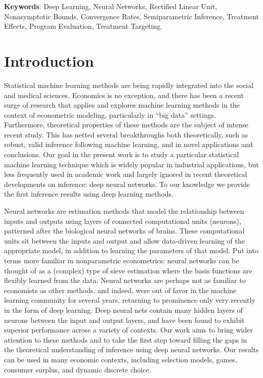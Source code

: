 \documentclass[11pt]{article}
\numberwithin{equation}{section}
\theoremstyle{definition}
\begin{document}
\textbf{Keywords}: Deep Learning, Neural Networks, Rectified Linear Unit, Nonasymptotic Bounds, Convergence Rates, Semiparametric Inference, Treatment Effects, Program Evaluation, Treatment Targeting.

\setcounter{page}{0}
\thispagestyle{empty}




\doublespacing





\section{Introduction}
	\label{sec:intro}
	



Statistical machine learning methods are being rapidly integrated into the social and medical sciences. Economics is no exception, and there has been a recent surge of research that applies and explores machine learning methods in the context of econometric modeling, particularly in ``big data'' settings. Furthermore, theoretical properties of these methods are the subject of intense recent study. This has netted several breakthroughs both theoretically, such as robust, valid inference following machine learning, and in novel applications and conclusions. Our goal in the present work is to study a particular statistical machine learning technique which is widely popular in industrial applications, but less frequently used in academic work and largely ignored in recent theoretical developments on inference: deep neural networks. To our knowledge we provide the first inference results using deep learning methods.

Neural networks are estimation methods that model the relationship between inputs and outputs using layers of connected computational units (neurons), patterned after the biological neural networks of brains. These computational units sit between the inputs and output and allow data-driven learning of the appropriate model, in addition to learning the parameters of that model. Put into terms more familiar in nonparametric econometrics: neural networks can be thought of as a (complex) type of sieve estimation where the basis functions are flexibly learned from the data. Neural networks are perhaps not as familiar to economists as other methods, and indeed, were out of favor in the machine learning community for several years, returning to prominence only very recently in the form of deep learning. Deep neural nets contain many hidden layers of neurons between the input and output layers, and have been found to exhibit superior performance across a variety of contexts. Our work aims to bring wider attention to these methods and to take the first step toward filling the gaps in the theoretical understanding of inference using deep neural networks. Our results can be used in many economic contexts, including selection models, games, consumer surplus, and dynamic discrete choice.
\end{document}
